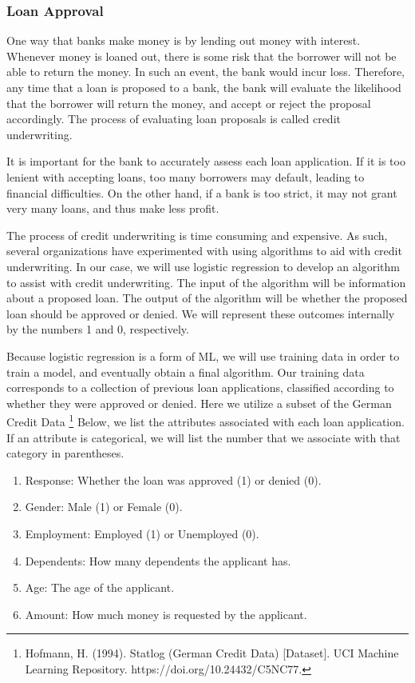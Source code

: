 \subsubsection{Loan Approval}
\par One way that banks make money is by lending out money with interest. Whenever money is loaned out, there is some risk that the borrower will not be able to return the money. In such an event, the bank would incur loss. Therefore, any time that a loan is proposed to a bank, the bank will evaluate the likelihood that the borrower will return the money, and accept or reject the proposal accordingly. The process of evaluating loan proposals is called credit underwriting.
\par It is important for the bank to accurately assess each loan application. If it is too lenient with accepting loans, too many borrowers may default, leading to financial difficulties. On the other hand, if a bank is too strict, it may not grant very many loans, and thus make less profit.
\par The process of credit underwriting is time consuming and expensive. As such, several organizations have experimented with using algorithms to aid with credit underwriting. In our case, we will use logistic regression to develop an algorithm to assist with credit underwriting. The input of the algorithm will be information about a proposed loan. The output of the algorithm will be whether the proposed loan should be approved or denied. We will represent these outcomes internally by the numbers 1 and 0, respectively.
\par Because logistic regression is a form of ML, we will use training data in order to train a model, and eventually obtain a final algorithm. Our training data corresponds to a collection of previous loan applications, classified according to whether they were approved or denied. Here we utilize a subset of the German Credit Data \footnote{Hofmann, H. (1994). Statlog (German Credit Data) [Dataset]. UCI Machine Learning Repository. https://doi.org/10.24432/C5NC77.} Below, we list the attributes associated with each loan application. If an attribute is categorical, we will list the number that we associate with that category in parentheses.
\begin{enumerate}
    \item Response: Whether the loan was approved (1) or denied (0).
    \item Gender: Male (1) or Female (0).
    \item Employment: Employed (1) or Unemployed (0).
    \item Dependents: How many dependents the applicant has.
    \item Age: The age of the applicant.
    \item Amount: How much money is requested by the applicant.
\end{enumerate}

